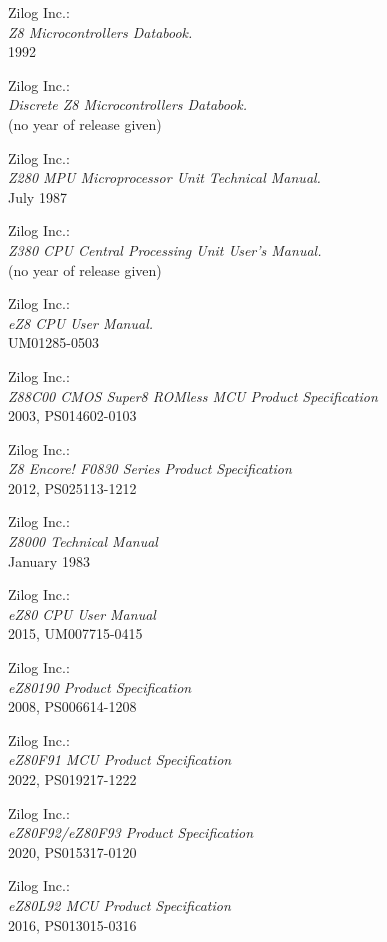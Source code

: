  Zilog Inc.: \\
                {\em Z8 Microcontrollers Databook.\/} \\
                1992

 Zilog Inc.: \\
                  {\em Discrete Z8 Microcontrollers Databook.\/} \\
                  (no year of release given)

 Zilog Inc.: \\
                  {\em Z280 MPU Microprocessor Unit Technical Manual.\/} \\
                  July 1987

 Zilog Inc.: \\
                  {\em Z380 CPU Central Processing Unit User's
                  Manual.\/} \\
                  (no year of release given)

 Zilog Inc.: \\
               {\em eZ8 CPU User Manual.\/} \\
               UM01285-0503

 Zilog Inc.: \\
               {\em Z88C00 CMOS Super8 ROMless MCU Product Specification\/} \\
               2003, PS014602-0103

 Zilog Inc.: \\
               {\em Z8 Encore! F0830 Series Product Specification\/} \\
               2012, PS025113-1212

 Zilog Inc.: \\
               {\em Z8000 Technical Manual\/} \\
               January 1983

 Zilog Inc.: \\
               {\em eZ80 CPU User Manual\/} \\
               2015, UM007715-0415

 Zilog Inc.: \\
               {\em eZ80190 Product Specification\/} \\
               2008, PS006614-1208

 Zilog Inc.: \\
               {\em eZ80F91 MCU Product Specification\/} \\
               2022, PS019217-1222

 Zilog Inc.: \\
               {\em eZ80F92/eZ80F93 Product Specification\/} \\
               2020, PS015317-0120

 Zilog Inc.: \\
               {\em eZ80L92 MCU Product Specification\/} \\
               2016, PS013015-0316
